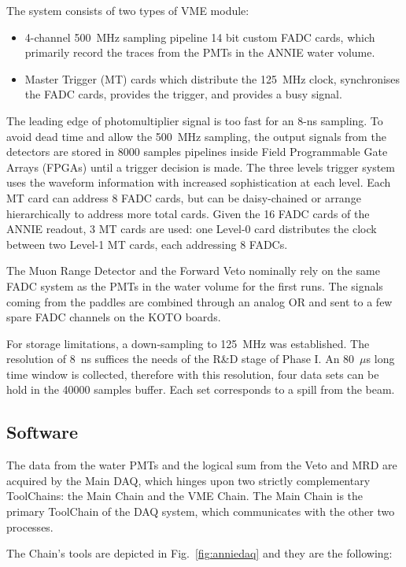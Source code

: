 The system consists of two types of VME module:
\begin{itemize}
  \item 4-channel 500~MHz sampling pipeline 14 bit custom FADC cards, which primarily record %
    the traces from the PMTs in the ANNIE water volume.
  \item Master Trigger (MT) cards which distribute the 125~MHz clock, synchronises the FADC %
    cards, provides the trigger, and provides a busy signal.
\end{itemize}

The leading edge of photomultiplier signal is too fast for an 8-ns sampling.
To avoid dead time and allow the 500~MHz sampling, the output signals from the detectors %
are stored in 8000 samples pipelines inside Field Programmable Gate Arrays (FPGAs) until %
a trigger decision is made.
The three levels trigger system uses the waveform information with increased %
sophistication at each level.
Each MT card can address 8 FADC cards, but can be daisy-chained or arrange hierarchically to %
address more total cards.
Given the 16 FADC cards of the ANNIE readout, 3 MT cards are used: %
one Level-0 card distributes the clock between two Level-1 MT cards, each addressing 8 FADCs.

The Muon Range Detector and the Forward Veto nominally rely on the same FADC system as %
the PMTs in the water volume for the first runs.
The signals coming from the paddles are combined through an analog OR and sent to a %
few spare FADC channels on the KOTO boards. 

For storage limitations, a down-sampling to 125~MHz was established.
The resolution of 8~ns suffices the needs of the R\&D stage of Phase I.
An 80~$\mu$s long time window is collected, therefore with this resolution, four data sets can be %
hold in the 40000 samples buffer.
Each set corresponds to a spill from the beam.

\subsection{Software}

The data from the water PMTs and the logical sum from the Veto and MRD are acquired by the Main DAQ, %
which hinges upon two strictly complementary ToolChains: the Main Chain and the VME Chain.
The Main Chain is the primary ToolChain of the DAQ system, which communicates with the other two %
processes.

The Chain's tools are depicted in Fig.~\ref{fig:anniedaq} and they are the following:

